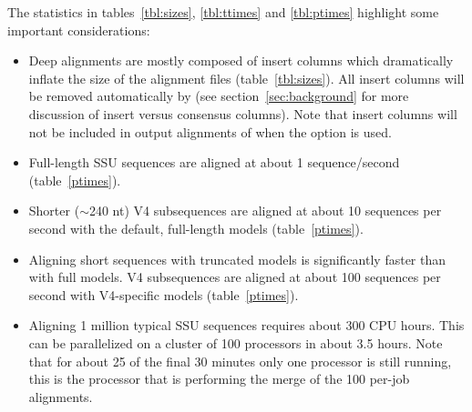 The statistics in tables~\ref{tbl:sizes}, \ref{tbl:ttimes} and
\ref{tbl:ptimes} highlight some important considerations:

\begin{itemize}

\item Deep alignments are mostly composed of insert columns which
  dramatically inflate the size of the alignment files
  (table~\ref{tbl:sizes}). All insert columns will be removed
  automatically by  (see section~\ref{sec:background}
  for more discussion of insert versus consensus columns). Note that
  insert columns will not be included in output alignments of
   when the  option is used.


\item Full-length SSU sequences are aligned at about 1
  sequence/second (table~\ref{ptimes}).

\item Shorter ($\sim$240 nt) V4 subsequences are aligned at about 10
  sequences per second with the default, full-length models (table~\ref{ptimes}).

\item Aligning short sequences with truncated models is significantly
  faster than with full models. V4 subsequences are aligned at about
  100 sequences per second with V4-specific models
  (table~\ref{ptimes}).


\item Aligning 1 million typical SSU sequences requires about 300
  CPU hours. This can be parallelized on a cluster of 100 processors
  in about 3.5 hours. Note that for about 25 of the final 30
  minutes only one processor is still running, this is the processor
  that is performing the merge of the 100 per-job alignments. 

\end{itemize}
%


%

